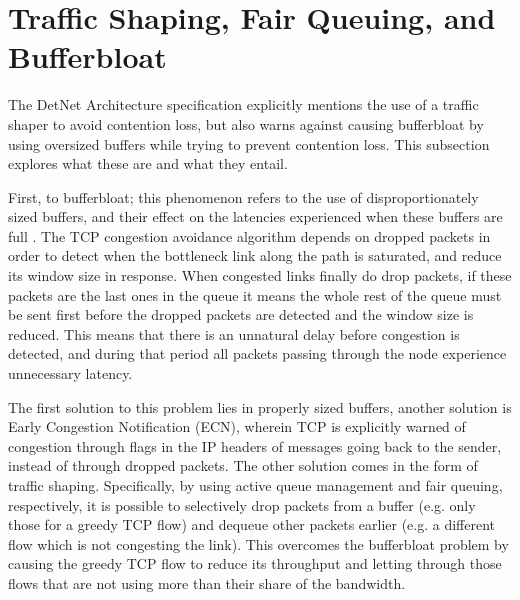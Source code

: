 \section{Traffic Shaping, Fair Queuing, and Bufferbloat}

The DetNet Architecture specification \cite{detnet-arch} explicitly mentions the use of a traffic shaper to avoid contention loss, but also warns against causing bufferbloat by using oversized buffers while trying to prevent contention loss. This subsection explores what these are and what they entail.

First, to bufferbloat; this phenomenon refers to the use of disproportionately sized buffers, and their effect on the latencies experienced when these buffers are full \cite{allman2012comments, gettys2011bufferbloat}. The TCP congestion avoidance algorithm depends on dropped packets in order to detect when the bottleneck link along the path is saturated, and reduce its window size in response. When congested links finally do drop packets, if these packets are the last ones in the queue it means the whole rest of the queue must be sent first before the dropped packets are detected and the window size is reduced. This means that there is an unnatural delay before congestion is detected, and during that period all packets passing through the node experience unnecessary latency. %

The first solution to this problem lies in properly sized buffers, another solution is Early Congestion Notification (ECN), wherein TCP is explicitly warned of congestion through flags in the IP headers of messages going back to the sender, instead of through dropped packets. The other solution comes in the form of traffic shaping. Specifically, by using active queue management and fair queuing, respectively,  it is possible to selectively drop packets from a buffer (e.g. only those for a greedy TCP flow) and dequeue other packets earlier (e.g. a different flow which is not congesting the link). This overcomes the bufferbloat problem by causing the greedy TCP flow to reduce its throughput and letting through those flows that are not using more than their share of the bandwidth.

